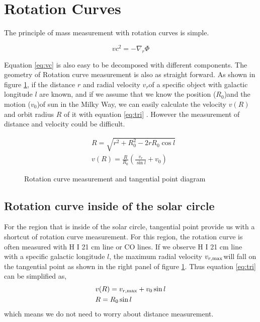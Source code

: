 \documentclass[preprint]{aastex}
\begin{document}
\section{Rotation Curves}

The principle of mass measurement with
rotation curves is simple.

\begin{equation}
  \label{eq:vc} vc^{2}=-\nabla_{r}\Phi
\end{equation}

Equation \ref{eq:vc} is also easy to be decomposed with
different components. The geometry of Rotation curve measurement is
also as straight forward. As shown in figure \ref{fig:tri}, if the
distance $r$ and radial velocity $v_{r}$of a specific object with
galactic longitude $l$ are known, and if we assume that we know the
position ($R_{0}$)and the motion ($v_{0}$)of sun in the Milky Way, we
can easily calculate the velocity $v(R)$ and orbit radius $R$ of it
with equation \ref{eq:tri} \cite{2013pss5.book..985S}. However the measurement of
distance and velocity could be difficult.

\begin{equation}
  \label{eq:tri}
  \begin{split} &R = \sqrt{r^{2} + R_{0}^{2} - 2rR_{0}\cos l}\\ &v(R)
= \frac{R}{R_{0}}\left(\frac{v_{r}}{\sin l}+v_{0}\right)
  \end{split}
\end{equation}

\begin{figure}[!t] \centering {}
  \caption{Rotation curve measurement and tangential point diagram
\cite{2013pss5.book..985S}}
  \label{fig:tri}
\end{figure}

\subsection{Rotation curve inside of the solar circle}

  For the region that is inside of the solar circle, tangential point
provide us with a shortcut of rotation curve measurement. For this
region, the rotation curve is often measured with H I 21 cm line or CO
lines. If we observe H I 21 cm line with a specific galactic longitude
$l$, the maximum radial velocity $v_{r,\rm max}$will fall on the
tangential point as shown in the right panel of figure
\ref{fig:tri}. Thus equation \ref{eq:tri} can be simplified as,
  \begin{equation}
    \label{eq:tan}
    \begin{split} &v(R)=v_{r, \rm max}+v_{0}\sin l\\ &R=R_{0}\sin l
      \end{split}
    \end{equation}
    which means we do not need to worry about distance
measurement.\par
\end{document}
